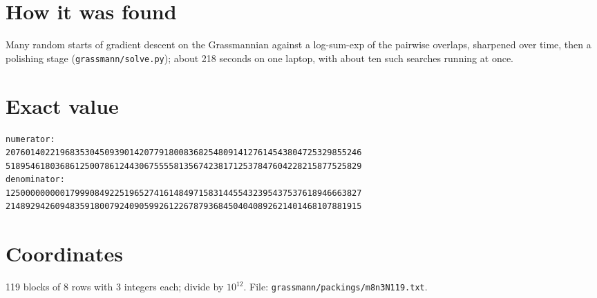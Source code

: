 \documentclass[11pt,a4paper]{article}
\begin{document}
\section{How it was found}
Many random starts of gradient descent on the Grassmannian against a log-sum-exp of the pairwise overlaps, sharpened over time, then a polishing stage (\texttt{grassmann/solve.py}); about 218 seconds on one laptop, with about ten such searches running at once.


\appendix
\section{Exact value}
{\small
\begin{verbatim}
numerator:
207601402219683530450939014207791800836825480914127614543804725329855246
518954618036861250078612443067555581356742381712537847604228215877525829
denominator:
125000000000179990849225196527416148497158314455432395437537618946663827
214892942609483591800792409059926122678793684504040892621401468107881915
\end{verbatim}}

\section{Coordinates}
119 blocks of 8 rows with 3 integers each; divide by $10^{12}$. File: \texttt{grassmann/packings/m8n3N119.txt}.
{\tiny
\begin{multicols}{3}
\end{multicols}}
\end{document}
